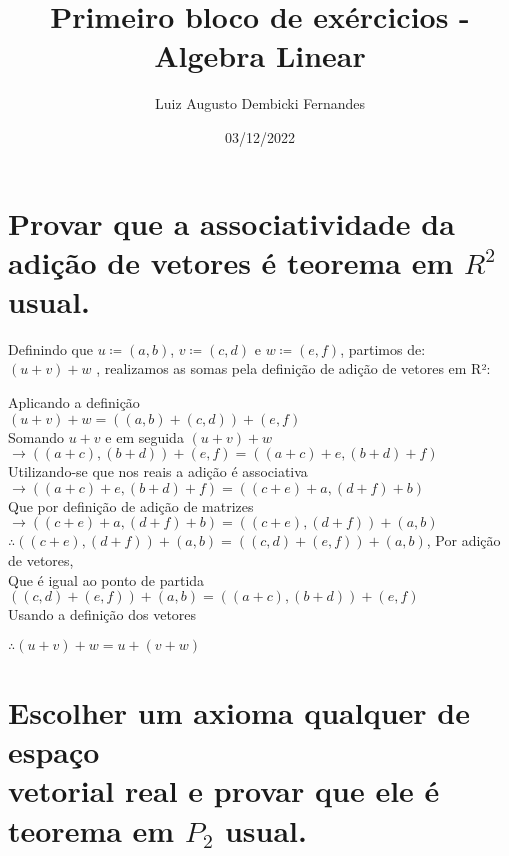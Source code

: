 \documentclass[12pt, twoside, a4]{article} %
\begin{document}
\title{Primeiro bloco de exércicios - Algebra Linear}
\author{Luiz Augusto Dembicki Fernandes}
\date{03/12/2022}
\maketitle

\section{Provar que a associatividade da adição de vetores é teorema em $ R^2 $ usual.}

\quad    Definindo que $ u \coloneqq (a, b)$, $v  \coloneqq  (c, d)$ e $w  \coloneqq  (e, f)$, partimos de:
$ (u + v) + w $ , realizamos as somas pela definição de adição de vetores em R²:
\begin{center}
    \begin{doublespacing}
        \vspace{-1cm}
        Aplicando a definição \\ 
        $ (u + v) + w = ((a, b) + (c, d)) + (e, f)$ \\
        Somando $u + v$ e em seguida $ (u + v) + w$ \\
        $ \to ((a + c), (b + d)) + (e, f) =  ((a + c) + e, (b + d) + f)$ \\
        Utilizando-se que nos reais a adição é associativa \\
        $ \to ((a + c) + e, (b + d) + f) = ((c + e) + a, (d + f) + b)$ \\
        Que por definição de adição de matrizes \\
        $ \to  ((c + e) + a, (d + f) + b) = ((c + e), (d + f)) + (a, b)$ \\
        $ \therefore ((c + e), (d + f)) + (a, b) = ((c, d) + (e, f)) + (a, b)$, Por adição de vetores, \\
        Que é igual ao ponto de partida \\
        $ ((c, d) + (e, f)) + (a, b) =  ((a + c), (b + d)) + (e, f)$ \\
        Usando a definição dos vetores \\
    \end{doublespacing}
    $ \therefore (u + v) + w = u + (v + w) $
\end{center}

\section{Escolher um axioma qualquer de espaço \\ vetorial real e provar que ele é teorema em $P_2$ usual.}
\end{document}
